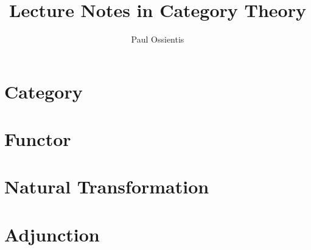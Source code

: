 \documentclass{report}
\title{Lecture Notes in Category Theory}
\author{Paul Ossientis}
\begin{document}
\maketitle
\tableofcontents
\newpage
\chapter{Category}
    
\chapter{Functor}
    
\chapter{Natural Transformation}
    
\chapter{Adjunction}
    
\printindex

\end{document}
